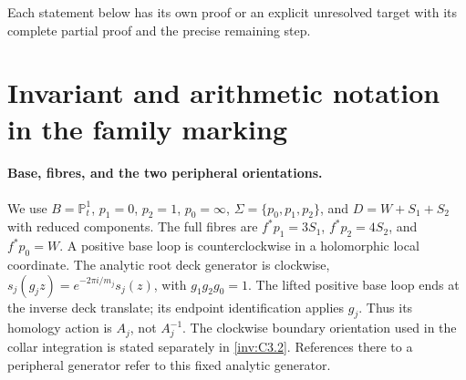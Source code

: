 Each statement below has its own proof or an explicit unresolved target
with its complete partial proof and the precise remaining step.


\section{Invariant and arithmetic notation in the family marking}
\label{inv:notation-dictionary}

\paragraph{Base, fibres, and the two peripheral orientations.}
We use $B=\mathbb P^1_t$, $p_1=0$, $p_2=1$, $p_0=\infty$,
$\Sigma=\{p_0,p_1,p_2\}$, and $D=W+S_1+S_2$ with reduced
components. The full fibres are $f^*p_1=3S_1$, $f^*p_2=4S_2$,
and $f^*p_0=W$. A positive base loop is counterclockwise in a
holomorphic local coordinate. The analytic root deck generator is
clockwise, $s_j(g_jz)=e^{-2\pi i/m_j}s_j(z)$, with
$g_1g_2g_0=1$. The lifted positive base loop ends at the inverse deck
translate; its endpoint identification applies $g_j$. Thus its
homology action is $A_j$, not $A_j^{-1}$.
The clockwise boundary orientation used in the collar integration
is stated separately in \cref{inv:C3.2}. References there to a
peripheral generator refer to this fixed analytic generator.

